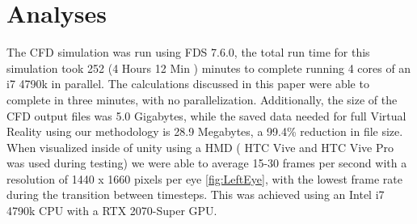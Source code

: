 \section{Analyses}

The CFD simulation was run using FDS 7.6.0, the total run time for this simulation took 252 (4 Hours 12 Min ) minutes to complete running 4 cores of an i7 4790k in parallel. The calculations discussed in this paper were able to complete in three minutes, with no parallelization.
Additionally, the size of the CFD output files was 5.0 Gigabytes, while the saved data needed for full Virtual Reality using our methodology is 28.9 Megabytes, a 99.4\% reduction in file size. When visualized inside of unity using a HMD ( HTC Vive and HTC Vive Pro was used during testing) we were able to average 15-30 frames per second with a resolution of 1440 x 1660 pixels per eye \ref{fig:LeftEye}, with the lowest frame rate during the transition between timesteps. This was achieved using an Intel i7 4790k CPU with a RTX 2070-Super GPU.


